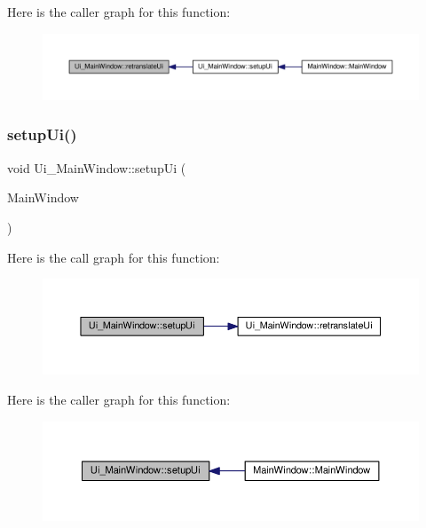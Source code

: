 Here is the caller graph for this function\+:
\nopagebreak
\begin{figure}[H]
\begin{center}
\leavevmode
\includegraphics[width=350pt]{class_ui___main_window_a097dd160c3534a204904cb374412c618_icgraph}
\end{center}
\end{figure}
\mbox{\label{class_ui___main_window_acf4a0872c4c77d8f43a2ec66ed849b58}} 
\subsubsection{\texorpdfstring{setup\+Ui()}{setupUi()}}
{\footnotesize\ttfamily void Ui\+\_\+\+Main\+Window\+::setup\+Ui (\begin{DoxyParamCaption}\item[{Q\+Main\+Window $\ast$}]{Main\+Window }\end{DoxyParamCaption})\hspace{0.3cm}{\ttfamily [inline]}}

Here is the call graph for this function\+:
\nopagebreak
\begin{figure}[H]
\begin{center}
\leavevmode
\includegraphics[width=350pt]{class_ui___main_window_acf4a0872c4c77d8f43a2ec66ed849b58_cgraph}
\end{center}
\end{figure}
Here is the caller graph for this function\+:
\nopagebreak
\begin{figure}[H]
\begin{center}
\leavevmode
\includegraphics[width=350pt]{class_ui___main_window_acf4a0872c4c77d8f43a2ec66ed849b58_icgraph}
\end{center}
\end{figure}


